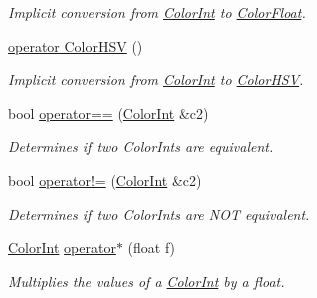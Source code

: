 \begin{DoxyCompactItemize}
\begin{DoxyCompactList}\small\item\em Implicit conversion from \hyperlink{structtsgl_1_1_color_int}{Color\-Int} to \hyperlink{structtsgl_1_1_color_float}{Color\-Float}. \end{DoxyCompactList}\item 
\hyperlink{structtsgl_1_1_color_int_acbd82ad2c6388389aa3474f042a25353}{operator Color\-H\-S\-V} ()
\begin{DoxyCompactList}\small\item\em Implicit conversion from \hyperlink{structtsgl_1_1_color_int}{Color\-Int} to \hyperlink{structtsgl_1_1_color_h_s_v}{Color\-H\-S\-V}. \end{DoxyCompactList}\item 
bool \hyperlink{structtsgl_1_1_color_int_a7d6282c79f42d4ba9a70c4475b8170c2}{operator==} (\hyperlink{structtsgl_1_1_color_int}{Color\-Int} \&c2)
\begin{DoxyCompactList}\small\item\em Determines if two Color\-Ints are equivalent. \end{DoxyCompactList}\item 
bool \hyperlink{structtsgl_1_1_color_int_af83865a1b76eb8c0a5e0fe4bc34fab2d}{operator!=} (\hyperlink{structtsgl_1_1_color_int}{Color\-Int} \&c2)
\begin{DoxyCompactList}\small\item\em Determines if two Color\-Ints are {\itshape N\-O\-T} equivalent. \end{DoxyCompactList}\item 
\hyperlink{structtsgl_1_1_color_int}{Color\-Int} \hyperlink{structtsgl_1_1_color_int_aa6dbbe3d7d1653e16eadc1843a6c3be1}{operator$\ast$} (float f)
\begin{DoxyCompactList}\small\item\em Multiplies the values of a \hyperlink{structtsgl_1_1_color_int}{Color\-Int} by a float. \end{DoxyCompactList}\end{DoxyCompactItemize}
